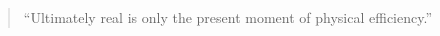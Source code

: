 \documentclass[10pt,a4paper,ragged2e,withhyper,academicons]{altacv}
\begin{document}
\makecvheader
\begin{paracol}{2} %




\newpage  %


\switchcolumn %

\begin{quote}``Ultimately real is only the present moment of physical efficiency.''\end{quote}





% 

\end{paracol}
\end{document}
